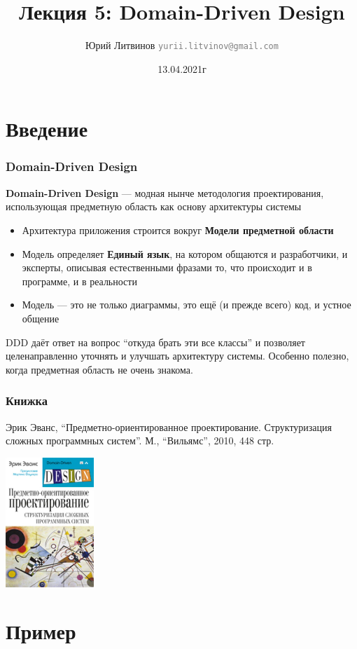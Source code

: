 \documentclass[xetex,mathserif,serif]{beamer}
\title{Лекция 5: Domain-Driven Design}
\author[Юрий Литвинов]{Юрий Литвинов \newline \textcolor{gray}{\small\texttt{yurii.litvinov@gmail.com}}}
\date{13.04.2021г}
\begin{document}
    
    \frame{\titlepage}

    \section{Введение}

    \begin{frame}
        \frametitle{Domain-Driven Design}
        \textbf{Domain-Driven Design} --- модная нынче методология проектирования, использующая предметную область как основу архитектуры системы
        \begin{itemize}
            \item Архитектура приложения строится вокруг \textbf{Модели предметной области}
            \item Модель определяет \textbf{Единый язык}, на котором общаются и разработчики, и эксперты, описывая естественными фразами то, что происходит и в программе, и в реальности
            \item Модель --- это не только диаграммы, это ещё (и прежде всего) код, и устное общение
        \end{itemize}
        DDD даёт ответ на вопрос ``откуда брать эти все классы'' и позволяет целенаправленно уточнять и улучшать архитектуру системы. 
        Особенно полезно, когда предметная область не очень знакома.
    \end{frame}

    \begin{frame}
        \frametitle{Книжка}
        Эрик Эванс, ``Предметно-ориентированное проектирование. Структуризация сложных программных систем''. М., ``Вильямс'', 2010, 448 стр.
        \begin{center}
            \includegraphics[width=0.25\textwidth]{dddCover.jpg}
        \end{center}
    \end{frame}

    \section{Пример}
\end{document}
